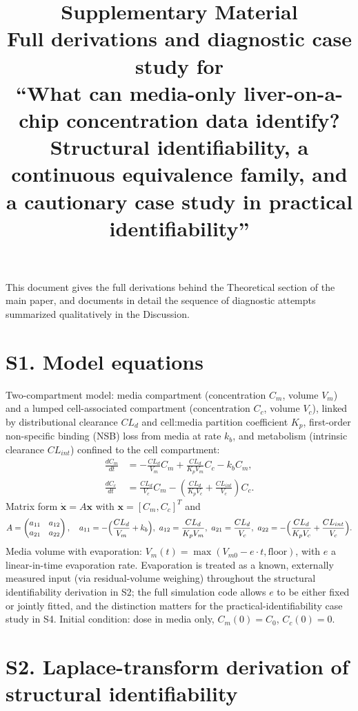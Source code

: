\documentclass[11pt]{article}
\title{Supplementary Material\\[2pt]\large Full derivations and diagnostic case study for\\``What can media-only liver-on-a-chip concentration data identify?\\Structural identifiability, a continuous equivalence family, and a cautionary case study in practical identifiability''}
\author{}
\date{}
\begin{document}
\maketitle

This document gives the full derivations behind the Theoretical section of the main paper, and documents in detail the sequence of diagnostic attempts summarized qualitatively in the Discussion.

\section*{S1. Model equations}

Two-compartment model: media compartment (concentration $C_m$, volume $V_m$) and a lumped cell-associated compartment (concentration $C_c$, volume $V_c$), linked by distributional clearance $CL_d$ and cell:media partition coefficient $K_p$, first-order non-specific binding (NSB) loss from media at rate $k_b$, and metabolism (intrinsic clearance $CL_{int}$) confined to the cell compartment:
\begin{align}
\frac{dC_m}{dt} &= -\frac{CL_d}{V_m}C_m + \frac{CL_d}{K_p V_m}C_c - k_b C_m, \\
\frac{dC_c}{dt} &= \frac{CL_d}{V_c}C_m - \left(\frac{CL_d}{K_p V_c} + \frac{CL_{int}}{V_c}\right)C_c.
\end{align}
Matrix form $\dot{\mathbf{x}} = A\mathbf{x}$ with $\mathbf{x}=[C_m,C_c]^T$ and
\[
A = \begin{pmatrix} a_{11} & a_{12} \\ a_{21} & a_{22} \end{pmatrix}, \quad
a_{11}=-\Bigl(\frac{CL_d}{V_m}+k_b\Bigr),\ a_{12}=\frac{CL_d}{K_pV_m},\ a_{21}=\frac{CL_d}{V_c},\ a_{22}=-\Bigl(\frac{CL_d}{K_pV_c}+\frac{CL_{int}}{V_c}\Bigr).
\]
Media volume with evaporation: $V_m(t) = \max(V_{m0} - e\cdot t, \text{floor})$, with $e$ a linear-in-time evaporation rate. Evaporation is treated as a known, externally measured input (via residual-volume weighing) throughout the structural identifiability derivation in S2; the full simulation code allows $e$ to be either fixed or jointly fitted, and the distinction matters for the practical-identifiability case study in S4. Initial condition: dose in media only, $C_m(0)=C_0$, $C_c(0)=0$.

\section*{S2. Laplace-transform derivation of structural identifiability}
\end{document}
